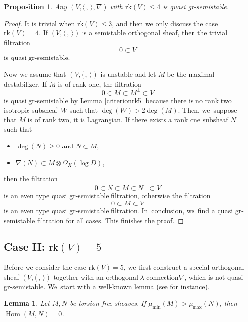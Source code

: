 \documentclass[JEP,XML,SOM,Unicode,published]{cedram}
\newcommand{\lconnection}{$\lambda$\nobreakdash-con\-nec\-tion\xspace}
\newcommand{\grsemistable}{gr\nobreakdash-semi\-stable\xspace}
\DeclareMathOperator{\Hom}{Hom}
\newcommand{\rk}{\mathrm{rk}}
\theoremstyle{plain}
\newtheorem{lem}[thm]{Lemma}
\newtheorem{prop}[thm]{Proposition}
\theoremstyle{definition}
\begin{document}
\begin{prop}\label{rank4}
Any $(V, \langle \,, \, \rangle, \nabla)$ with $\rk(V) \leq 4$ is quasi \grsemistable.
\end{prop}

\begin{proof}
It is trivial when $\rk(V)\leq3$, and then we only discuss the case $\rk(V)=4$. If $(V, \langle \,, \, \rangle)$ is a semistable orthogonal sheaf, then the trivial filtration\vspace*{-3pt}
\[
0\subset V
\]
is quasi \grsemistable.

Now we assume that $(V, \langle \,, \, \rangle)$ is unstable and let $M$ be the maximal destabilizer. If $M$ is of rank one, the filtration\vspace*{-3pt}
\[
0\subset M\subset M^\perp\subset V
\]
is quasi \grsemistable by Lemma \ref{criterionrk5} because there is no rank two isotropic subsheaf~$W$ such that $\deg(W) > 2 \deg(M)$. Then, we~suppose that $M$ is of rank two, \ie it is Lagrangian. If there exists a rank one subsheaf $N$ such that
\begin{itemize}
\item $\deg(N) \geq 0$ and $N \subset M$,
\item $\nabla(N) \subset M\otimes \Omega_X(\log D)$,
\end{itemize}
then the filtration\vspace*{-3pt}
\[
0\subset N\subset M\subset N^\perp\subset V
\]
is an even type quasi \grsemistable filtration, otherwise the filtration\vspace*{-3pt}
\[
0\subset M\subset V
\]
is an even type quasi \grsemistable filtration. In~conclusion, we~find a quasi \grsemistable filtration for all cases. This finishes the proof.
\end{proof}

\subsection{Case II: ${\rk(V) = 5}$}\label{subsect_rak_5}
Before we consider the case $\rk(V)=5$, we~first construct a special orthogonal sheaf $(V, \langle \,, \, \rangle)$ together with an orthogonal \lconnection $\nabla$, which is not quasi \grsemistable. We~start with a well-known lemma (see \cite[Lem.\,1.3.3]{HL97} for instance).

\begin{lem}\label{lem_max_min}
Let $M, N$ be torsion free sheaves. If $\mu_{\min}(M) > \mu_{\max}(N)$, then $\Hom(M,N) = 0$.
\end{lem}
\end{document}
